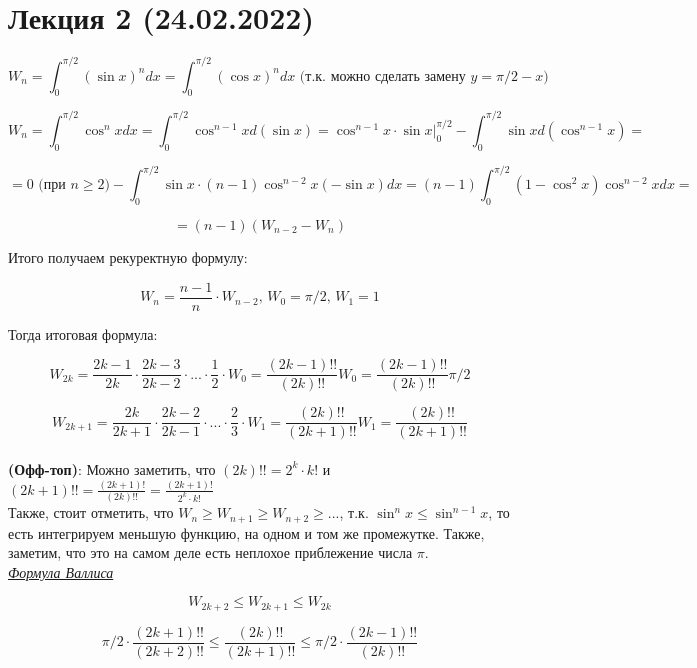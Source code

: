 \section*{Лекция 2 (24.02.2022)}

\begin{example}

 \[
     W_n = \int_0^{\pi / 2}{(\sin{x})^n} dx = \int_0^{\pi / 2}{(\cos{x})^n}dx \text{ (т.к. можно сделать замену $y = \pi / 2 - x$)} 
\]

\[
    W_n = \int_0^{\pi / 2}\cos^n{x}dx = \int_0^{\pi / 2}\cos^{n - 1}{x} d(\sin{x}) = \cos^{n - 1}{x} \cdot \sin{x} \bigg|_{0}^{\pi/2} - \int_{0}^{\pi / 2}\sin{x} d(\cos^{n - 1}{x}) = 
\]

\[
    = 0 \text{ (при $n \geqslant 2$)} - \int_0^{\pi / 2} \sin{x} \cdot (n - 1) \cos^{n - 2}{x}(-\sin{x}) dx = (n - 1)\int_{0}^{\pi / 2}(1 - \cos^2{x}) \cos^{n - 2}{x} dx = 
\]

\[
    = (n - 1)(W_{n - 2} - W_{n})
\]

Итого получаем рекуректную формулу:

\[
    W_n = \frac{n - 1}{n} \cdot W_{n - 2}, \, W_0 = \pi / 2, \, W_1 = 1
\]

Тогда итоговая формула:

\[
    W_{2k} = \frac{2k - 1}{2k} \cdot \frac{2k - 3}{2k - 2} \cdot ... \cdot \frac{1}{2} \cdot W_0 = \frac{(2k - 1)!!}{(2k)!!} W_0 = \frac{(2k - 1)!!}{(2k)!!} \pi / 2
\]

\[
    W_{2k + 1} = \frac{2k}{2k + 1} \cdot \frac{2k - 2}{2k - 1} \cdot ... \cdot \frac{2}{3} \cdot W_1 = \frac{(2k)!!}{(2k + 1)!!} W_1 = \frac{(2k)!!}{(2k + 1)!!} 
\]
\\

\textbf{(Офф-топ)}: Можно заметить, что $(2k)!! = 2 ^ k \cdot k!$ и $(2k + 1)!! = \frac{(2k + 1)!}{(2k)!!} = \frac{(2k + 1)!}{2^k \cdot k!}$
\\
\newpage
Также, стоит отметить, что $W_n \geqslant W_{n + 1} \geqslant W_{n + 2} \geqslant ...$, т.к. $\sin^n{x} \leqslant \sin^{n - 1}{x}$, то есть интегрируем меньшую функцию, на одном и том же промежутке.
Также, заметим, что это на самом деле есть неплохое приблежение числа $\pi$.\\

\underline{\textit{Формула Валлиса}}

\[
    W_{2k + 2} \leqslant W_{2k + 1} \leqslant W_{2k}
\]

\[
    \pi / 2 \cdot \frac{(2k + 1)!!}{(2k + 2)!!} \leqslant \frac{(2k)!!}{(2k + 1)!!} \leqslant \pi / 2 \cdot \frac{(2k - 1)!!}{(2k)!!}
\]


\end{example}
